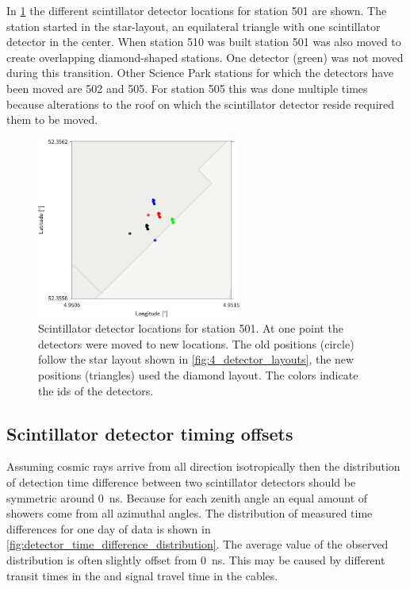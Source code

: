 In \cref{fig:station_501_detectors_4D} the different scintillator detector locations for station 501 are shown. The station started in the star-layout, an equilateral triangle with one scintillator detector in the center. When station 510 was built station 501 was also moved to create overlapping diamond-shaped stations. One detector (green) was not moved during this transition. Other Science Park stations for which the detectors have been moved are 502 and 505. For station 505 this was done multiple times because alterations to the roof on which the scintillator detector reside required them to be moved.

\begin{figure}
    \centering
    \includegraphics[width=0.6\textwidth]
                    {plots/station/station_501_detectors_4D}
    \caption{Scintillator detector locations for station 501. At one point the detectors were moved to new locations. The old positions (circle) follow the star layout shown in \cref{fig:4_detector_layouts}, the new positions (triangles) used the diamond layout. The colors indicate the ids of the detectors.}
    \label{fig:station_501_detectors_4D}
\end{figure}


\subsection{Scintillator detector timing offsets}
\label{sec:detector-offsets}

Assuming cosmic rays arrive from all direction isotropically then the distribution of detection time difference between two scintillator detectors should be symmetric around \SI{0}{\ns}. Because for each zenith angle an equal amount of showers come from all azimuthal angles. The distribution of measured time differences for one day of data is shown in \cref{fig:detector_time_difference_distribution}. The average value of the observed distribution is often slightly offset from \SI{0}{\ns}. This may be caused by different transit times in the \pmt and signal travel time in the cables.

